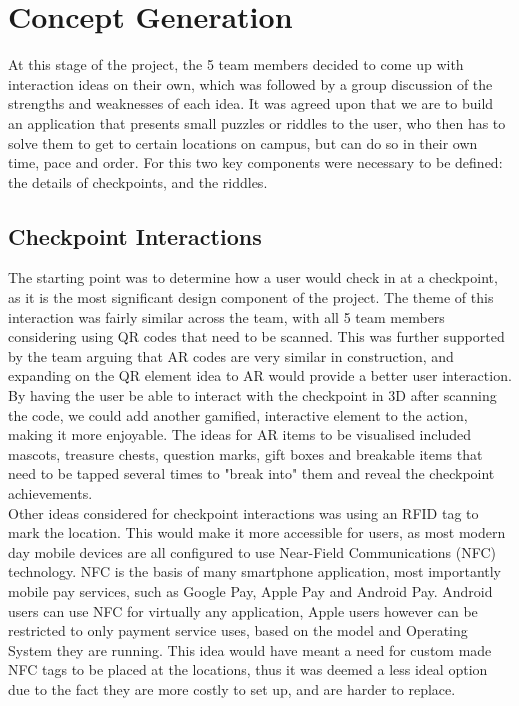 \documentclass[10pt,twocolumn]{article} %
\begin{document}
\section*{Concept Generation}
At this stage of the project, the 5 team members decided to come up with interaction ideas on their own, which was followed by a group discussion of the strengths and weaknesses of each idea.
It was agreed upon that we are to build an application that presents small puzzles or riddles to the user, who then has to solve them to get to certain locations on campus, but can do so in their own time, pace and order.
For this two key components were necessary to be defined: the details of checkpoints, and the riddles.
\subsection*{Checkpoint Interactions}
The starting point was to determine how a user would check in at a checkpoint, as it is the most significant design component of the project. 
The theme of this interaction was fairly similar across the team, with all 5 team members considering using QR codes that need to be scanned. 
This was further supported by the team arguing that AR codes are very similar in construction, and expanding on the QR element idea to AR would provide a better user interaction. 
By having the user be able to interact with the checkpoint in 3D after scanning the code, we could add another gamified, interactive element to the action, making it more enjoyable. 
The ideas for AR items to be visualised included mascots, treasure chests, question marks, gift boxes and breakable items that need to be tapped several times to "break into" them and reveal the checkpoint achievements.\\
Other ideas considered for checkpoint interactions was using an RFID tag to mark the location. This would make it more accessible for users, as most modern day mobile devices are all configured to use Near-Field Communications (NFC) technology. 
NFC is the basis of many smartphone application, most importantly mobile pay services, such as Google Pay, Apple Pay and Android Pay. Android users can use NFC for virtually any application, Apple users however can be restricted to only payment service uses, based on the model and Operating System they are running. 
This idea would have meant a need for custom made NFC tags to be placed at the locations, thus it was deemed a less ideal option due to the fact they are more costly to set up, and are harder to replace.
\end{document}
